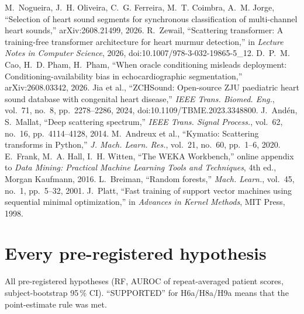 \documentclass[11pt,a4paper]{article}
\begin{document}
\begin{thebibliography}{99}
 M.~Nogueira, J.~H. Oliveira, C.~G. Ferreira, M.~T. Coimbra, A.~M. Jorge, ``Selection of heart sound segments for synchronous classification of multi-channel heart sounds,'' arXiv:2608.21499, 2026.
 R.~Zewail, ``Scattering transformer: A training-free transformer architecture for heart murmur detection,'' in \emph{Lecture Notes in Computer Science}, 2026, doi:10.1007/978-3-032-19865-5\_12.
 D.~P.~M. Cao, H.~D. Pham, H.~Pham, ``When oracle conditioning misleads deployment: Conditioning-availability bias in echocardiographic segmentation,'' arXiv:2608.03342, 2026.
 Jia et al., ``ZCHSound: Open-source ZJU paediatric heart sound database with congenital heart disease,'' \emph{IEEE Trans. Biomed. Eng.}, vol.~71, no.~8, pp.~2278--2286, 2024, doi:10.1109/TBME.2023.3348800.
 J.~Andén, S.~Mallat, ``Deep scattering spectrum,'' \emph{IEEE Trans. Signal Process.}, vol.~62, no.~16, pp.~4114--4128, 2014.
 M.~Andreux et al., ``Kymatio: Scattering transforms in Python,'' \emph{J. Mach. Learn. Res.}, vol.~21, no.~60, pp.~1--6, 2020.
 E.~Frank, M.~A. Hall, I.~H. Witten, ``The WEKA Workbench,'' online appendix to \emph{Data Mining: Practical Machine Learning Tools and Techniques}, 4th ed., Morgan Kaufmann, 2016.
 L.~Breiman, ``Random forests,'' \emph{Mach. Learn.}, vol.~45, no.~1, pp.~5--32, 2001.
 J.~Platt, ``Fast training of support vector machines using sequential minimal optimization,'' in \emph{Advances in Kernel Methods}, MIT Press, 1998.
\end{thebibliography}

\appendix
\section{Every pre-registered hypothesis}\label{app:hyp}
\begin{table}[H]\centering\caption{All pre-registered hypotheses (RF, AUROC of repeat-averaged patient scores, subject-bootstrap 95\,\% CI). ``SUPPORTED'' for H6a/H8a/H9a means that the point-estimate rule was met.}
\resizebox{\textwidth}{!}{}\end{table}
\end{document}
